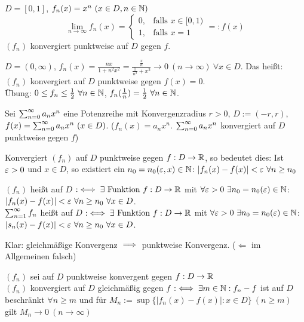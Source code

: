 \documentclass[a4paper,twoside,DIV15,BCOR12mm]{scrbook}
\begin{document}
\begin{beispiele}
\item $D=[0,1]$, $f_n(x) = x^n\ (x\in D, n\in\mathbb{N})$
$$ \lim_{n\to\infty} f_n(x) = \begin{cases} 0, & \text{falls }x\in[0,1) \\ 1, & \text{falls } x=1\end{cases} =: f(x) $$
$(f_n)$ konvergiert punktweise auf $D$ gegen $f$.

\item $D=(0,\infty)$, $f_n(x) = \frac{nx}{1+n^2x^2} = \frac{\frac{x}{n}}{\frac{1}{n^2} + x^2} \to 0 \ (n\to\infty)\ \forall x\in D$. Das heißt: $(f_n)$ konvergiert auf $D$ punktweise gegen $f(x)=0$. \\
Übung: $0\le f_n \le \frac{1}{2} \ \forall n\in\mathbb{N}$, $f_n(\frac{1}{n}) = \frac{1}{2} \ \forall n\in\mathbb{N}$.

\item Sei $\sum_{n=0}^{\infty}{a_nx^n}$ eine Potenzreihe mit Konvergenzradius $r>0$, $D:=(-r,r)$, $f(x) = \sum_{n=0}^{\infty}{a_nx^n} \ (x\in D)$. ($f_n(x) = a_nx^n$. $\sum_{n=0}^{\infty}{a_nx^n}$ konvergiert auf $D$ punktweise gegen $f$)
\end{beispiele}

Konvergiert $(f_n)$ auf $D$ punktweise gegen $f:D\to\mathbb{R}$, so bedeutet dies: Ist $\varepsilon>0$ und $x\in D$, so existiert ein $n_0 = n_0(\varepsilon,x)\in\mathbb{N}$: $|f_n(x)-f(x)|<\varepsilon \ \forall n\ge n_0$

\begin{definition}
$(f_n)$ heißt auf $D$  $:\iff \exists \text{ Funktion } f:D\to\mathbb{R}$ mit $\forall \ep>0 \ \exists n_0 = n_0(\ep) \in\MdN$: $|f_n(x) - f(x)|<\varepsilon \ \forall n\ge n_0 \ \forall x\in D$. \\
$\sum_{n=1}^{\infty}{f_n}$ heißt auf $D$  $:\iff \exists \text{ Funktion } f:D\to\mathbb{R}$ mit $\forall \ep>0 \ \exists n_0 = n_0(\ep) \in\MdN$: $|s_n(x) - f(x)|<\varepsilon \ \forall n\ge n_0 \ \forall x\in D$.
\end{definition}

Klar: gleichmäßige Konvergenz $\implies$ punktweise Konvergenz. ($\Leftarrow$ im Allgemeinen falsch)

\begin{bemerkung}
$(f_n)$ sei auf $D$ punktweise konvergent gegen $f:D\to \mathbb{R}$\\
$(f_n)$ konvergiert auf $D$ gleichmäßig gegen $f$ $:\iff \exists m\in\mathbb{N}: f_n - f$ ist auf $D$ beschränkt $\forall n\ge m$ und für $M_n := \sup\{|f_n(x) - f(x)|: x\in D\}\ (n\ge m)$ gilt $M_n \to 0\ (n\to\infty)$
\end{bemerkung}
\end{document}
